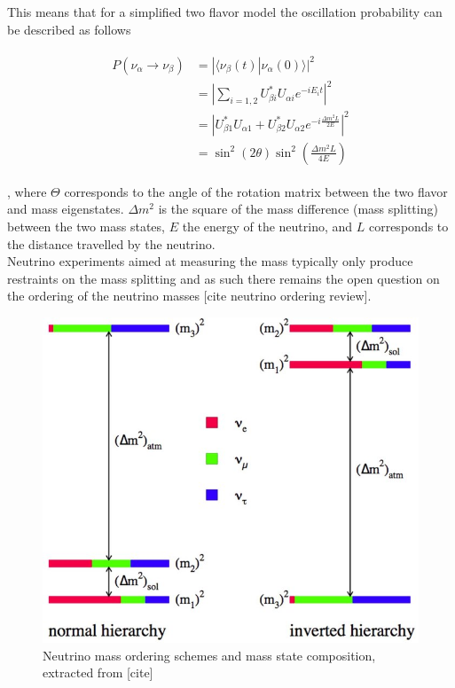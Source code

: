 \documentclass[a4paper,12pt,numbered]{article}
\begin{document}
This means that for a simplified two flavor model the oscillation probability can be described as follows

\begin{align}
\begin{split}
P(\nu_\alpha \rightarrow \nu_\beta) &= |\langle \nu_\beta(t) | \nu_\alpha(0) \rangle|^2 \\
&= \left| \sum_{i=1,2} U_{\beta i}^* U_{\alpha i} e^{-i E_i t} \right|^2 \\
&= \left| U_{\beta 1}^* U_{\alpha 1} + U_{\beta 2}^* U_{\alpha 2} e^{-i \frac{\Delta m^2 L}{2E}} \right|^2 \\
&= \sin^2(2\theta) \sin^2 \left( \frac{\Delta m^2 L}{4E} \right)
\end{split}
\end{align}

, where $\Theta$ corresponds to the angle of the rotation matrix between the two flavor and mass eigenstates. $\Delta m^2$ is the square of the mass difference (mass splitting) between the two mass states, $E$ the energy of the neutrino, and $L$ corresponds to the distance travelled by the neutrino.
\\
Neutrino experiments aimed at measuring the mass typically only produce restraints on the mass splitting and as such there remains the open question on the ordering of the neutrino masses [cite neutrino ordering review].

\begin{figure}[H]
\begin{center}
\includegraphics[width=0.75 \textwidth]{Neutrino_Figures/mass_ordering.jpg}
\caption{Neutrino mass ordering schemes and mass state composition, extracted from [cite]}
\end{center}
\end{figure}
\end{document}
